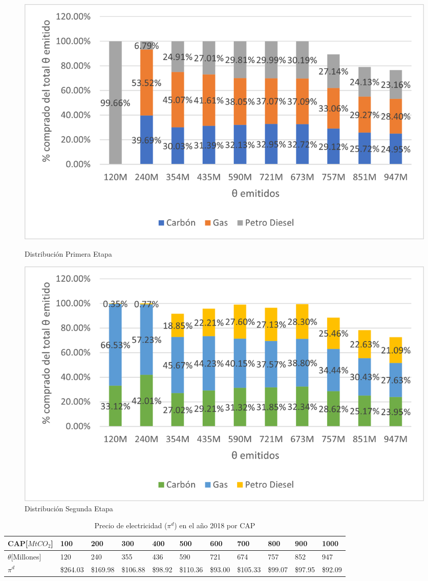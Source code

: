 \begin{figure}[H]
  \centering
  \begin{minipage}[b]{0.49\textwidth}
    \includegraphics[width=\textwidth]{docs/DocumentoMemoria/core/images/distr primera etapa precision.png}
    \caption{{\footnotesize Distribución Primera Etapa}}
  \end{minipage}
  \hfill
  \begin{minipage}[b]{0.49\textwidth}
    \includegraphics[width=\textwidth]{docs/DocumentoMemoria/core/images/distr segunda etapa precision.png}
    \caption{{\footnotesize Distribución Segunda Etapa}}
  \end{minipage}
\end{figure}

\begin{table}[H]
\begin{footnotesize}
    \centering
    \begin{tabular}{|l|l|l|l|l|l|l|l|l|l|l|}
    \hline
       CAP[$MtCO_2$] & 100 & 200 & 300 & 400 & 500 & 600 & 700 & 800 & 900 & 1000 \\ \hline
          $\theta$[Millones] & 120 & 240 & 355 & 436 & 590 & 721 & 674 & 757 & 852 & 947 \\ \hline
    $\pi^d$  &  \$264.03   &  \$169.98   &  \$106.88   &  \$98.92   &  \$110.36   &  \$93.00   &  \$105.33   &  \$99.07   &  \$97.95   &  \$92.09   \\ \hline
    \end{tabular}
    \caption{{\footnotesize Precio de electricidad ($\pi^d$) en el año 2018 por CAP }}
    \label{Ppidporcap}
\end{footnotesize}
\end{table}

